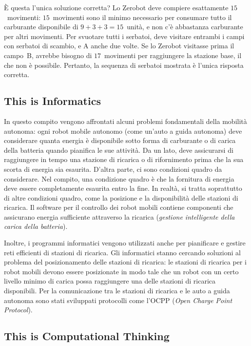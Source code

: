 \documentclass[a4paper,11pt]{report}
\begin{document}
È questa l’unica soluzione corretta? Lo Zerobot deve compiere esattamente $15$~movimenti: $15$~movimenti sono il minimo necessario per consumare tutto il carburante disponibile di ${9 + 3 + 3 = 15}$~unità, e non c’è abbastanza carburante per altri movimenti. Per svuotare tutti i serbatoi, deve visitare entrambi i campi con serbatoi di scambio, e A anche due volte. Se lo Zerobot visitasse prima il campo~B, avrebbe bisogno di $17$~movimenti per raggiungere la stazione base, il che non è possibile. Pertanto, la sequenza di serbatoi mostrata è l’unica risposta corretta.


\subsection*{This is Informatics}

In questo compito vengono affrontati alcuni problemi fondamentali della mobilità autonoma: ogni robot mobile autonomo (come un’auto a guida autonoma) deve considerare quanta energia è disponibile sotto forma di carburante o di carica della batteria quando pianifica le sue attività. Da un lato, deve assicurarsi di raggiungere in tempo una stazione di ricarica o di rifornimento prima che la sua scorta di energia sia esaurita. D’altra parte, ci sono condizioni quadro da considerare. Nel compito, una condizione quadro è che la fornitura di energia deve essere completamente esaurita entro la fine. In realtà, si tratta soprattutto di altre condizioni quadro, come la posizione e la disponibilità delle stazioni di ricarica. Il software per il controllo dei robot mobili contiene componenti che assicurano energia sufficiente attraverso la ricarica (\emph{gestione intelligente della carica della batteria}).

Inoltre, i programmi informatici vengono utilizzati anche per pianificare e gestire reti efficienti di stazioni di ricarica. Gli informatici stanno cercando soluzioni al problema del posizionamento delle stazioni di ricarica: le stazioni di ricarica per i robot mobili devono essere posizionate in modo tale che un robot con un certo livello minimo di carica possa raggiungere una delle stazioni di ricarica disponibili. Per la comunicazione tra le stazioni di ricarica e le auto a guida autonoma sono stati sviluppati protocolli come l’OCPP (\emph{Open Charge Point Protocol}).


\subsection*{This is Computational Thinking}
\end{document}
